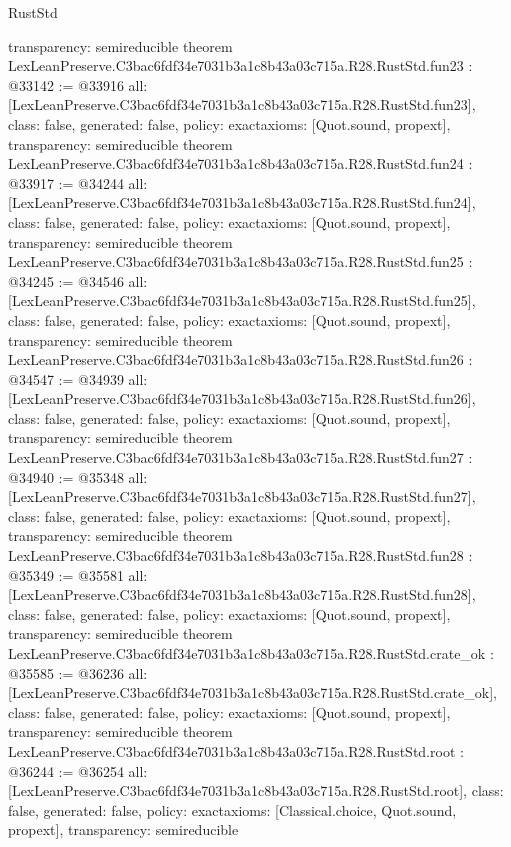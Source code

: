 \begin{lexlean}{RustStd}
\begin{coremodule}
{  transparency: semireducible
}
theorem LexLeanPreserve.C3bac6fdf34e7031b3a1c8b43a03c715a.R28.RustStd.fun23 : @33142 := @33916 {
  all: [LexLeanPreserve.C3bac6fdf34e7031b3a1c8b43a03c715a.R28.RustStd.fun23],
  class: false,
  generated: false,
  policy: exact{axioms: [Quot.sound, propext]},
  transparency: semireducible
}
theorem LexLeanPreserve.C3bac6fdf34e7031b3a1c8b43a03c715a.R28.RustStd.fun24 : @33917 := @34244 {
  all: [LexLeanPreserve.C3bac6fdf34e7031b3a1c8b43a03c715a.R28.RustStd.fun24],
  class: false,
  generated: false,
  policy: exact{axioms: [Quot.sound, propext]},
  transparency: semireducible
}
theorem LexLeanPreserve.C3bac6fdf34e7031b3a1c8b43a03c715a.R28.RustStd.fun25 : @34245 := @34546 {
  all: [LexLeanPreserve.C3bac6fdf34e7031b3a1c8b43a03c715a.R28.RustStd.fun25],
  class: false,
  generated: false,
  policy: exact{axioms: [Quot.sound, propext]},
  transparency: semireducible
}
theorem LexLeanPreserve.C3bac6fdf34e7031b3a1c8b43a03c715a.R28.RustStd.fun26 : @34547 := @34939 {
  all: [LexLeanPreserve.C3bac6fdf34e7031b3a1c8b43a03c715a.R28.RustStd.fun26],
  class: false,
  generated: false,
  policy: exact{axioms: [Quot.sound, propext]},
  transparency: semireducible
}
theorem LexLeanPreserve.C3bac6fdf34e7031b3a1c8b43a03c715a.R28.RustStd.fun27 : @34940 := @35348 {
  all: [LexLeanPreserve.C3bac6fdf34e7031b3a1c8b43a03c715a.R28.RustStd.fun27],
  class: false,
  generated: false,
  policy: exact{axioms: [Quot.sound, propext]},
  transparency: semireducible
}
theorem LexLeanPreserve.C3bac6fdf34e7031b3a1c8b43a03c715a.R28.RustStd.fun28 : @35349 := @35581 {
  all: [LexLeanPreserve.C3bac6fdf34e7031b3a1c8b43a03c715a.R28.RustStd.fun28],
  class: false,
  generated: false,
  policy: exact{axioms: [Quot.sound, propext]},
  transparency: semireducible
}
theorem LexLeanPreserve.C3bac6fdf34e7031b3a1c8b43a03c715a.R28.RustStd.crate_ok : @35585 := @36236 {
  all: [LexLeanPreserve.C3bac6fdf34e7031b3a1c8b43a03c715a.R28.RustStd.crate_ok],
  class: false,
  generated: false,
  policy: exact{axioms: [Quot.sound, propext]},
  transparency: semireducible
}
theorem LexLeanPreserve.C3bac6fdf34e7031b3a1c8b43a03c715a.R28.RustStd.root : @36244 := @36254 {
  all: [LexLeanPreserve.C3bac6fdf34e7031b3a1c8b43a03c715a.R28.RustStd.root],
  class: false,
  generated: false,
  policy: exact{axioms: [Classical.choice, Quot.sound, propext]},
  transparency: semireducible
}


\end{coremodule}
\end{lexlean}
